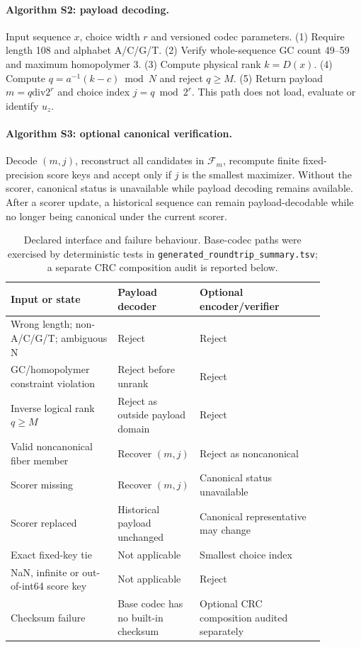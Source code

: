 \documentclass[10pt]{article}
\begin{document}
\paragraph{Algorithm S2: payload decoding.}
Input sequence $x$, choice width $r$ and versioned codec parameters. (1) Require length 108 and alphabet A/C/G/T. (2) Verify whole-sequence GC count 49--59 and maximum homopolymer 3. (3) Compute physical rank $k=D(x)$. (4) Compute $q=a^{-1}(k-c)\bmod N$ and reject $q\geq M$. (5) Return payload $m=q\mathbin{\mathrm{div}}2^r$ and choice index $j=q\bmod2^r$. This path does not load, evaluate or identify $u_z$.

\paragraph{Algorithm S3: optional canonical verification.}
Decode $(m,j)$, reconstruct all candidates in $\mathcal F_m$, recompute finite fixed-precision score keys and accept only if $j$ is the smallest maximizer. Without the scorer, canonical status is unavailable while payload decoding remains available. After a scorer update, a historical sequence can remain payload-decodable while no longer being canonical under the current scorer.

\begin{table}[H]
\centering
\small
\begin{tabular}{@{}p{0.30\linewidth}p{0.23\linewidth}p{0.35\linewidth}@{}}
\toprule
Input or state & Payload decoder & Optional encoder/verifier\\
\midrule
Wrong length; non-A/C/G/T; ambiguous N & Reject & Reject\\
GC/homopolymer constraint violation & Reject before unrank & Reject\\
Inverse logical rank $q\geq M$ & Reject as outside payload domain & Reject\\
Valid noncanonical fiber member & Recover $(m,j)$ & Reject as noncanonical\\
Scorer missing & Recover $(m,j)$ & Canonical status unavailable\\
Scorer replaced & Historical payload unchanged & Canonical representative may change\\
Exact fixed-key tie & Not applicable & Smallest choice index\\
NaN, infinite or out-of-int64 score key & Not applicable & Reject\\
Checksum failure & Base codec has no built-in checksum & Optional CRC composition audited separately\\
\bottomrule
\end{tabular}
\caption{Declared interface and failure behaviour. Base-codec paths were exercised by deterministic tests in \texttt{generated\_roundtrip\_summary.tsv}; a separate CRC composition audit is reported below.}
\label{tab:s-failure-behavior}
\end{table}
\end{document}

